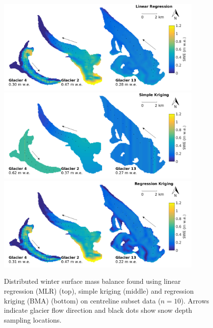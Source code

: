 \documentclass[12pt]{article}
\newcommand{\topomap}{Arrows indicate glacier flow direction and black dots show snow depth sampling locations. }
\begin{document}
\pagebreak
\begin{figure}[H]
	\centering
	\includegraphics[width =0.9\textwidth]{MapSubset_LRcentreline_n10S4.png}\\
	\includegraphics[width =0.9\textwidth]{MapSubset_SKcentreline_n10S4.png}\\
	\includegraphics[width =0.9\textwidth]{MapSubset_RKcentreline_n10S4.png}\\
	\caption{Distributed winter surface mass balance found using  linear regression (MLR) (top), simple kriging (middle) and regression kriging (BMA) (bottom) on centreline subset data ($n=10$).  \topomap}
	\label{fig:MapSubset_centreline_n10S4}
\end{figure}



\end{document}
